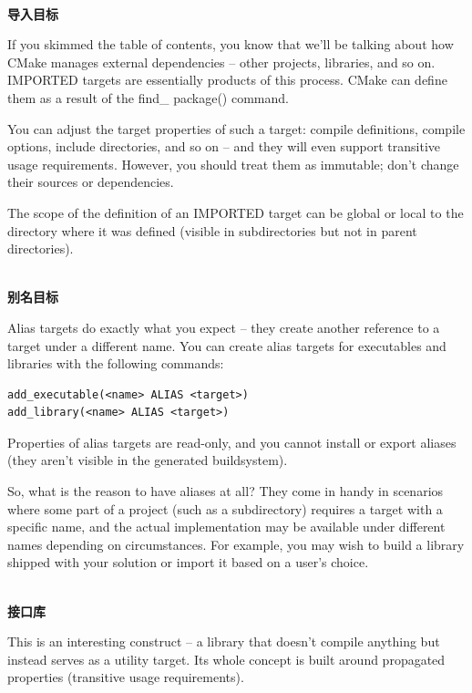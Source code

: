 \hspace*{\fill} \\ %
\noindent
\textbf{导入目标}

If you skimmed the table of contents, you know that we'll be talking about how CMake manages external dependencies – other projects, libraries, and so on. IMPORTED targets are essentially products of this process. CMake can define them as a result of the find\_ package() command.

You can adjust the target properties of such a target: compile definitions, compile options, include directories, and so on – and they will even support transitive usage requirements. However, you should treat them as immutable; don't change their sources or dependencies.

The scope of the definition of an IMPORTED target can be global or local to the directory where it was defined (visible in subdirectories but not in parent directories).

\hspace*{\fill} \\ %
\noindent
\textbf{别名目标}

Alias targets do exactly what you expect – they create another reference to a target under a different name. You can create alias targets for executables and libraries with the following commands:

\begin{lstlisting}[style=styleCMake]
add_executable(<name> ALIAS <target>)
add_library(<name> ALIAS <target>)
\end{lstlisting}

Properties of alias targets are read-only, and you cannot install or export aliases (they aren't visible in the generated buildsystem).

So, what is the reason to have aliases at all? They come in handy in scenarios where some part of a project (such as a subdirectory) requires a target with a specific name, and the actual implementation may be available under different names depending on circumstances. For example, you may wish to build a library shipped with your solution or import it based on a user's choice.

\hspace*{\fill} \\ %
\noindent
\textbf{接口库}

This is an interesting construct – a library that doesn't compile anything but instead serves as a utility target. Its whole concept is built around propagated properties (transitive usage requirements).

